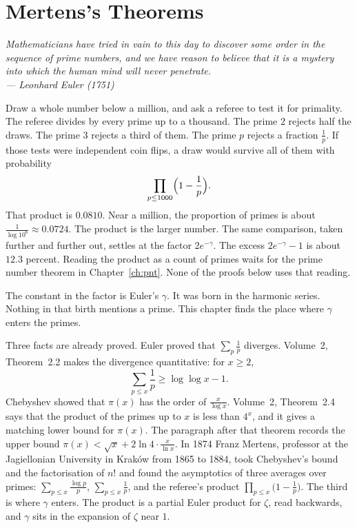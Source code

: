 \chapter{Mertens's Theorems}\label{ch:mertens}

\begin{center}\itshape
Mathematicians have tried in vain to this day to discover some order in the sequence of prime numbers, and we have
reason to believe that it is a mystery into which the human mind will never penetrate.\\
\upshape --- Leonhard Euler (1751)
\end{center}

Draw a whole number below a million, and ask a referee to test it for primality. The referee divides by every prime up to a thousand. The prime $2$ rejects half the draws. The prime $3$ rejects a third of them. The prime $p$ rejects a fraction $\frac1p$. If those tests were independent coin flips, a draw would survive all of them with probability
\[
\prod_{p\le 1000}\Bigl(1-\frac1p\Bigr).
\]
That product is $0.0810$. Near a million, the proportion of primes is about $\frac1{\log 10^6}\approx 0.0724$. The product is the larger number. The same comparison, taken further and further out, settles at the factor $2e^{-\gamma}$. The excess $2e^{-\gamma}-1$ is about $12.3$ percent. Reading the product as a count of primes waits for the prime number theorem in Chapter~\ref{ch:pnt}. None of the proofs below uses that reading.

The constant in the factor is Euler's $\gamma$. It was born in the harmonic series. Nothing in that birth mentions a prime. This chapter finds the place where $\gamma$ enters the primes.


Three facts are already proved. Euler proved that $\sum_p\frac1p$ diverges. Volume~2, Theorem~2.2 makes the divergence quantitative: for $x\ge 2$,
\[
\sum_{p\le x}\frac1p\ge\log\log x-1.
\]
Chebyshev showed that $\pi(x)$ has the order of $\frac x{\log x}$. Volume~2, Theorem~2.4 says that the product of the primes up to $x$ is less than $4^x$, and it gives a matching lower bound for $\pi(x)$. The paragraph after that theorem records the upper bound $\pi(x)<\sqrt x+2\ln 4\cdot\frac x{\ln x}$. In 1874 Franz Mertens, professor at the Jagiellonian University in Krak\'ow from 1865 to 1884, took Chebyshev's bound and the factorisation of $n!$ and found the asymptotics of three averages over primes: $\sum_{p\le x}\frac{\log p}p$, $\sum_{p\le x}\frac1p$, and the referee's product $\prod_{p\le x}\bigl(1-\frac1p\bigr)$. The third is where $\gamma$ enters. The product is a partial Euler product for $\zeta$, read backwards, and $\gamma$ sits in the expansion of $\zeta$ near $1$.

